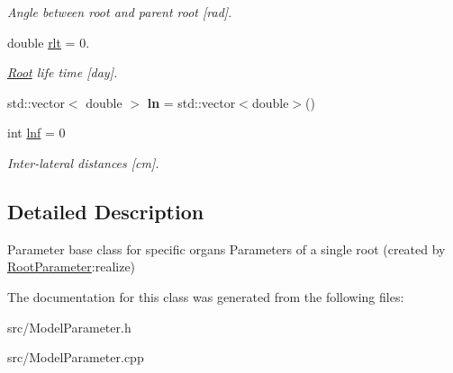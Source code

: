 \begin{DoxyCompactItemize}
\begin{DoxyCompactList}\small\item\em Angle between root and parent root \mbox{[}rad\mbox{]}. \end{DoxyCompactList}\item 
\mbox{\label{classCPlantBox_1_1StemParameter_a2a39b06bbe7eef3e295017e2ec2240c6}} 
double \hyperlink{classCPlantBox_1_1StemParameter_a2a39b06bbe7eef3e295017e2ec2240c6}{rlt} = 0.
\begin{DoxyCompactList}\small\item\em \hyperlink{classCPlantBox_1_1Root}{Root} life time \mbox{[}day\mbox{]}. \end{DoxyCompactList}\item 
\mbox{\label{classCPlantBox_1_1StemParameter_a47656bec4b804d4e304acf02bedd8740}} 
std\+::vector$<$ double $>$ {\bfseries ln} = std\+::vector$<$double$>$()
\item 
\mbox{\label{classCPlantBox_1_1StemParameter_ac695d4e1ec87a78b07aa699a335a3632}} 
int \hyperlink{classCPlantBox_1_1StemParameter_ac695d4e1ec87a78b07aa699a335a3632}{lnf} = 0
\begin{DoxyCompactList}\small\item\em Inter-\/lateral distances \mbox{[}cm\mbox{]}. \end{DoxyCompactList}\end{DoxyCompactItemize}


\subsection{Detailed Description}
Parameter base class for specific organs Parameters of a single root (created by \hyperlink{classCPlantBox_1_1RootParameter}{Root\+Parameter}\+:realize) 

The documentation for this class was generated from the following files\+:\begin{DoxyCompactItemize}
\item 
src/Model\+Parameter.\+h\item 
src/Model\+Parameter.\+cpp\end{DoxyCompactItemize}
